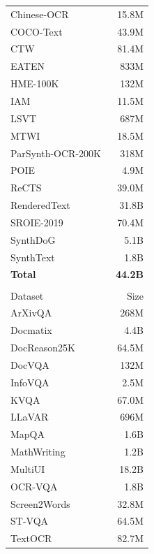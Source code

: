 \begin{table}[!h]
\begin{minipage}[t]{0.245\textwidth}
\begin{tabular}{lr}
Chinese-OCR~\cite{xu2018chineseocr} & 15.8M \\
COCO-Text~\cite{veit2016cocotext} & 43.9M \\
CTW~\cite{yuan2019ctw} & 81.4M \\
EATEN~\cite{guo2019eaten} & 833M \\
HME-100K~\cite{yuan2022hme100k} & 132M \\
IAM~\cite{marti2002iam} & 11.5M \\
LSVT~\cite{sun2019icdar} & 687M \\
MTWI~\cite{he2018mtwi} & 18.5M \\
ParSynth-OCR-200K~\cite{singh2021parsynth} & 318M \\
POIE~\cite{kuang2023poie} & 4.9M \\
ReCTS~\cite{zhang2019icdar} & 39.0M \\
RenderedText~\cite{wendlerf2023renderedtext} & 31.8B \\
SROIE-2019~\cite{huang2019icdar} & 70.4M \\
SynthDoG~\cite{kim2022donut} & 5.1B \\
SynthText~\cite{gupta2016synthtext} & 1.8B \\
\midrule
\textbf{Total} & \textbf{44.2B} \\
\midrule
\rowcolor{instructcolor}\multicolumn{2}{l}{\textit{OCR QA}} \\
Dataset & Size \\
\midrule
ArXivQA~\cite{li2024multimodalarxiv} & 268M \\
Docmatix~\cite{laurencon2024building} & 4.4B \\
DocReason25K~\cite{hu2024docowl15} & 64.5M \\
DocVQA~\cite{mathew2021docvqa} & 132M \\
InfoVQA~\cite{mathew2022infographicvqa} & 2.5M \\
KVQA~\cite{shah2019kvqa} & 67.0M \\
LLaVAR~\cite{zhang2023llavar} & 696M \\
MapQA~\cite{chang2022mapqa} & 1.6B \\
MathWriting~\cite{gervais2024mathwriting} & 1.2B \\
MultiUI~\cite{liu2024harnessing} & 18.2B \\
OCR-VQA~\cite{mishra2019ocrvqa} & 1.8B \\
Screen2Words~\cite{wang2021screen2words} & 32.8M \\
ST-VQA~\cite{biten2019stvqa} & 64.5M \\
TextOCR~\cite{singh2021textocr} & 82.7M \\

\end{tabular}
\end{minipage}
\end{table}
